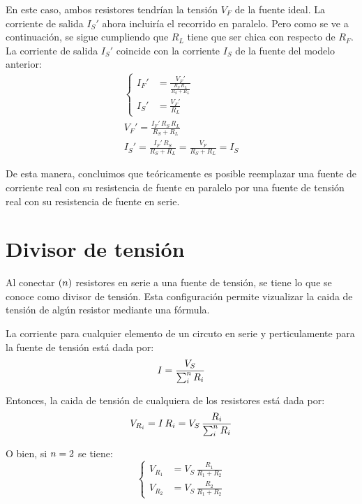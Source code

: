 En este caso, ambos resistores tendrían la tensión $V_F$ de la fuente ideal.
La corriente de salida $I_S'$ ahora incluiría el recorrido en paralelo.
Pero como se ve a continuación, se sigue cumpliendo que $R_L$ tiene que ser chica con respecto de $R_F$.
La corriente de salida $I_S'$ coincide con la corriente $I_S$ de la fuente del modelo anterior:
\begin{gather*}
    \left\{
    \begin{aligned}
        I_F' &= \frac{V_F'}{\frac{R_S \, R_L}{R_S + R_L}}
        \\[1ex]
        I_S' &= \frac{V_F'}{R_L}
    \end{aligned}
    \right.
    \\[1em]
    V_F' = \frac{I_F' \, R_S \, R_L}{R_S + R_L}
    \\[1em]
    I_S' = \frac{I_F' \, R_S}{R_S + R_L} = \frac{V_F}{R_S + R_L} = I_S
\end{gather*}

De esta manera, concluimos que teóricamente es posible reemplazar una fuente de corriente real con su resistencia de fuente en paralelo por una fuente de tensión real con su resistencia de fuente en serie.


\section{Divisor de tensión}

Al conectar $(n)$ resistores en serie a una fuente de tensión, se tiene lo que se conoce como divisor de tensión.
Esta configuración permite vizualizar la caida de tensión de algún resistor mediante una fórmula.

\begin{center}
    \def\svgwidth{0.5\linewidth}
    
\end{center}

La corriente para cualquier elemento de un circuto en serie y perticulamente para la fuente de tensión está dada por:
\begin{equation*}
    I = \frac{V_S}{\sum_i^n R_i}
\end{equation*}

Entonces, la caida de tensión de cualquiera de los resistores está dada por:
\begin{equation*}
    V_{R_i} = I \, R_i = V_S \, \frac{R_i}{\sum_i^n R_i}
\end{equation*}

O bien, si $n=2$ se tiene:
\begin{equation*}
    \left\{
    \begin{aligned}
        V_{R_1} &= V_S \, \frac{R_1}{R_1 + R_2}
        \\[1ex]
        V_{R_2} &= V_S \, \frac{R_2}{R_1 + R_2}
    \end{aligned}
    \right.
\end{equation*}


